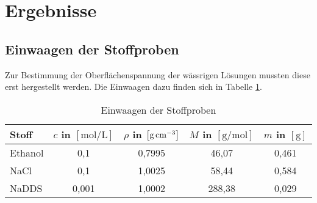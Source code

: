 \newpage
\section{Ergebnisse}
\label{sec:ergebnisse}

\subsection*{Einwaagen der Stoffproben}
Zur Bestimmung der Oberflächenspannung der wässrigen Lösungen mussten diese erst hergestellt werden. Die Einwaagen dazu finden sich in Tabelle \ref{tab:einwaage}.
\vspace*{-4mm}
\begin{table}[h!]
	\centering
	\caption{Einwaagen der Stoffproben}
	\begin{tabular}{l|ccc|c}
		\hline
		\textbf{Stoff} & $c$ in $\left[\si{\mol \per \liter}\right]$ & $\rho$ in $\left[\si{\gram \per \raiseto{3}\centi \meter}\right]$& $M$ in $\left[\si{\gram \per \mol}\right]$ & $m$ in $\left[\si{\gram}\right]$\\
		\hline
		Ethanol & 0,1   & 0,7995 & 46,07 & 0,461 \\
		NaCl  & 0,1   & 1,0025 & 58,44 & 0,584\\
		NaDDS & 0,001 & 1,0002 & 288,38 & 0,029 \\
		\hline
	\end{tabular}%
	\label{tab:einwaage}%
\end{table}%
\vspace*{-4mm}
